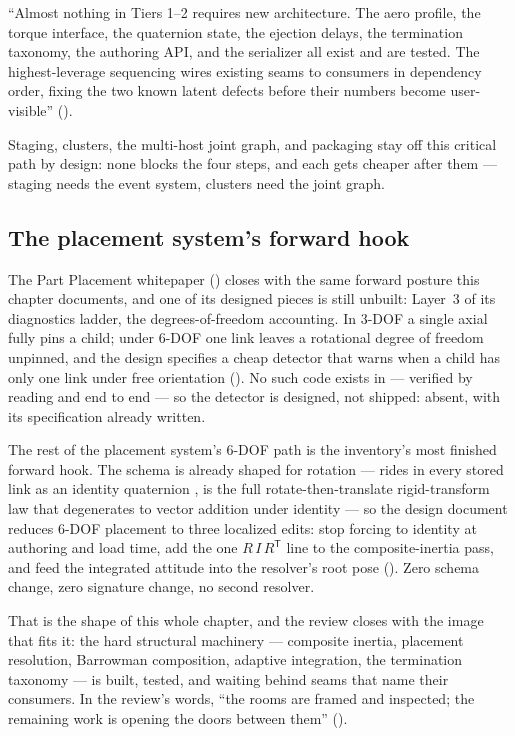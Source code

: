 \begin{designrule}
``Almost nothing in Tiers 1--2 requires new architecture. The aero profile, the torque
interface, the quaternion state, the ejection delays, the termination taxonomy, the
authoring API, and the serializer all exist and are tested. The highest-leverage sequencing
wires existing seams to consumers in dependency order, fixing the two known latent defects
before their numbers become user-visible''
().
\end{designrule}

Staging, clusters, the multi-host joint graph, and packaging stay off this critical path by
design: none blocks the four steps, and each gets cheaper after them --- staging needs the
event system, clusters need the joint graph.

\subsection{The placement system's forward hook}\label{sec:incomplete-hook}

The Part Placement whitepaper () closes with the same
forward posture this chapter documents, and one of its designed pieces is still unbuilt:
Layer~3 of its diagnostics ladder, the degrees-of-freedom accounting. In 3-DOF a single
axial  fully pins a child; under 6-DOF one link leaves a rotational
degree of freedom unpinned, and the design specifies a cheap detector that warns when a
child has only one link under free orientation
(). No such code exists in
 --- verified by reading  and
 end to end --- so the detector is designed, not shipped:
absent, with its specification already written.

The rest of the placement system's 6-DOF path is the inventory's most finished forward
hook. The schema is already shaped for rotation ---  rides in every stored
link as an identity quaternion ,  is
the full rotate-then-translate rigid-transform law that degenerates to vector addition
under identity  --- so the design document reduces 6-DOF
placement to three localized edits: stop forcing  to identity at authoring
and load time, add the one $R\,I\,R^{\mathsf{T}}$ line to the composite-inertia pass, and
feed the integrated attitude into the resolver's root pose
(). Zero schema change, zero
signature change, no second resolver.

That is the shape of this whole chapter, and the review closes with the image that fits it:
the hard structural machinery --- composite inertia, placement resolution, Barrowman
composition, adaptive integration, the termination taxonomy --- is built, tested, and
waiting behind seams that name their consumers. In the review's words, ``the rooms are
framed and inspected; the remaining work is opening the doors between them''
().
